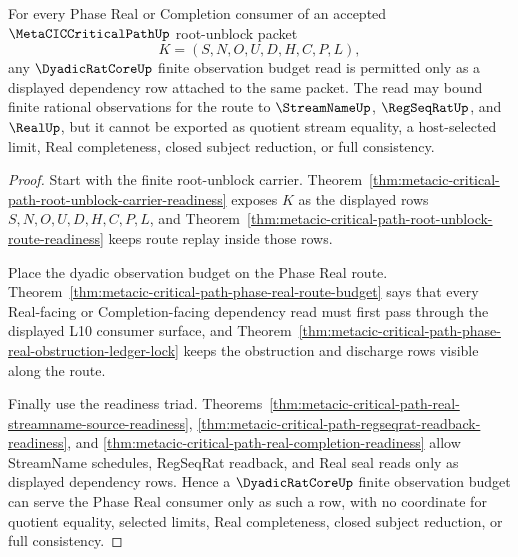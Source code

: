 \begin{theorem}
\label{thm:metacic-critical-path-dyadicratcore-budget-readiness}
For every Phase Real or Completion consumer of an accepted $\MetaCICCriticalPathUp$ root-unblock packet
$$
K=(S,N,O,U,D,H,C,P,L),
$$
any $\DyadicRatCoreUp$ finite observation budget read is permitted only as a displayed dependency row attached to the same packet. The read may bound finite rational observations for the route to $\StreamNameUp$, $\RegSeqRatUp$, and $\RealUp$, but it cannot be exported as quotient stream equality, a host-selected limit, Real completeness, closed subject reduction, or full consistency.
\end{theorem}
\begin{proof}
Start with the finite root-unblock carrier. Theorem~\ref{thm:metacic-critical-path-root-unblock-carrier-readiness} exposes $K$ as the displayed rows $S,N,O,U,D,H,C,P,L$, and Theorem~\ref{thm:metacic-critical-path-root-unblock-route-readiness} keeps route replay inside those rows.

Place the dyadic observation budget on the Phase Real route. Theorem~\ref{thm:metacic-critical-path-phase-real-route-budget} says that every Real-facing or Completion-facing dependency read must first pass through the displayed L10 consumer surface, and Theorem~\ref{thm:metacic-critical-path-phase-real-obstruction-ledger-lock} keeps the obstruction and discharge rows visible along the route.

Finally use the readiness triad. Theorems~\ref{thm:metacic-critical-path-real-streamname-source-readiness}, \ref{thm:metacic-critical-path-regseqrat-readback-readiness}, and \ref{thm:metacic-critical-path-real-completion-readiness} allow StreamName schedules, RegSeqRat readback, and Real seal reads only as displayed dependency rows. Hence a $\DyadicRatCoreUp$ finite observation budget can serve the Phase Real consumer only as such a row, with no coordinate for quotient equality, selected limits, Real completeness, closed subject reduction, or full consistency.
\end{proof}

